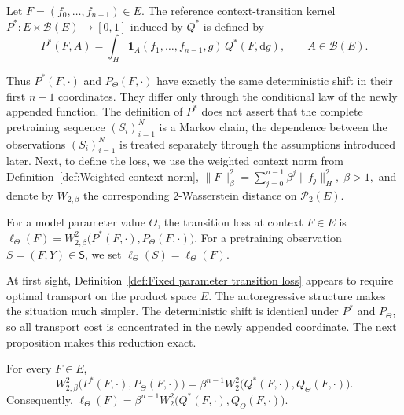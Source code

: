 \begin{definition}
\label{def:Reference context transition kernel}
Let \(F=(f_0,\ldots,f_{n-1})\in E\). The reference context-transition kernel \(P^*:E\times\mathcal B(E)\to[0,1]\) induced by \(Q^*\) is defined by
\[
P^*(F,A)
=
\int_H
\mathbf 1_A(f_1,\ldots,f_{n-1},g)\,
Q^*(F,\mathrm dg),
\qquad
A\in\mathcal B(E).
\]
\end{definition}

Thus \(P^*(F,\cdot)\) and \(P_\Theta(F,\cdot)\) have exactly the same deterministic shift in their first \(n-1\) coordinates. They differ only through the conditional law of the newly appended function. The definition of \(P^*\) does not assert that the complete pretraining sequence \((S_i)_{i=1}^N\) is a Markov chain, the dependence between the observations \((S_i)_{i=1}^N\) is treated separately through the assumptions introduced later.
Next, to define the loss, we use the weighted context norm from Definition~\ref{def:Weighted context norm},
\(
\|F\|_\beta^2
=
\sum_{j=0}^{n-1}\beta^j\|f_j\|_H^2,\;
\beta>1,
\)
and denote by \(W_{2,\beta}\) the corresponding \(2\)-Wasserstein distance on \(\mathcal P_2(E)\).

\begin{definition}
\label{def:Fixed parameter transition loss}
For a model parameter value \(\Theta\), the transition loss at context \(F\in E\) is
\(
\ell_\Theta(F)
=
W_{2,\beta}^2
\bigl(
P^*(F,\cdot),
P_\Theta(F,\cdot)
\bigr).
\)
For a pretraining observation \(S=(F,Y)\in\mathsf S\), we set \(\ell_\Theta(S)=\ell_\Theta(F)\).
\end{definition}

At first sight, Definition~\ref{def:Fixed parameter transition loss} appears to require optimal transport on the product space \(E\). The autoregressive structure makes the situation much simpler. The deterministic shift is identical under \(P^*\) and \(P_\Theta\), so all transport cost is concentrated in the newly appended coordinate. The next proposition makes this reduction exact.

\begin{proposition}
\label{prop:Reduction of context transition loss}
For every \(F\in E\),
\[
W_{2,\beta}^2
\bigl(
P^*(F,\cdot),
P_\Theta(F,\cdot)
\bigr)
=
\beta^{n-1}
W_2^2
\bigl(
Q^*(F,\cdot),
Q_\Theta(F,\cdot)
\bigr).
\]
Consequently,
\(
\ell_\Theta(F)
=
\beta^{n-1}
W_2^2
\bigl(
Q^*(F,\cdot),
Q_\Theta(F,\cdot)
\bigr).
\)
\end{proposition}

